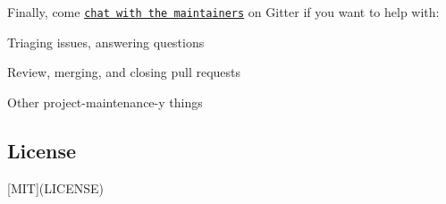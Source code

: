 Finally, come \href{https://gitter.im/mochajs/contributors}{\tt chat with the maintainers} on Gitter if you want to help with\+:


\begin{DoxyItemize}
\item Triaging issues, answering questions
\item Review, merging, and closing pull requests
\item Other project-\/maintenance-\/y things
\end{DoxyItemize}

\subsection*{License}

\mbox{[}M\+IT\mbox{]}(L\+I\+C\+E\+N\+SE)

\href{https://app.fossa.io/projects/git%2Bhttps%3A%2F%2Fgithub.com%2Fmochajs%2Fmocha?ref=badge_large}{\tt } 